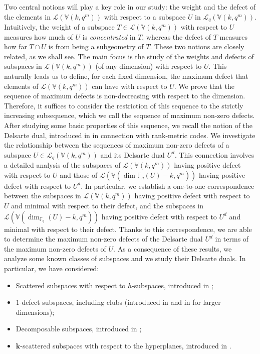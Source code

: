 \documentclass[11pt]{amsart}
\newcommand{\fq}{{\mathbb F}_{q}}
\begin{document}
Two central notions will play a key role in our study: the weight and the defect of the elements in ${\mathcal L}(\mathbb{V}(k, q^m))$ with respect to a subspace $U$ in ${\mathcal L}_q(\mathbb{V}(k, q^m))$.
Intuitively, the weight of a subspace $T \in {\mathcal L}(\mathbb{V}(k, q^m))$ with respect to $U$ measures how much of $U$ is \emph{concentrated} in $T$, whereas the defect of $T$ measures how far $T \cap U$ is from being a subgeometry of $T$. These two notions are closely related, as we shall see.
The main focus is the study of the weights and defects of subspaces in ${\mathcal L}(\mathbb{V}(k, q^m))$ (of any dimension) with respect to $U$. This naturally leads us to define, for each fixed dimension, the maximum defect that  elements of ${\mathcal L}(\mathbb{V}(k, q^m))$ can have with respect to $U$.
We prove that the sequence of maximum defects is non-decreasing with respect to the dimension. Therefore, it suffices to consider the restriction of this sequence to the strictly increasing subsequence, which we call the sequence of maximum non-zero defects.
After studying some basic properties of this sequence, we recall the notion of the Delsarte dual, introduced in \cite{csajbok2021generalising} in connection with rank-metric codes.
We investigate the relationship between the sequences of maximum non-zero defects of a subspace $U \in \mathcal{L}_q(\mathbb{V}(k,q^m))$ and its Delsarte dual $U^d$.
This connection involves a detailed analysis of the subspaces of $\mathcal{L}(\mathbb{V}(k,q^m))$ having positive defect with respect to $U$ and those of $\mathcal{L}(\mathbb{V}(\dim{\fq}(U)-k,q^m))$ having positive defect with respect to $U^d$.
In particular, we establish a one-to-one correspondence between the subspaces in $\mathcal{L}(\mathbb{V}(k,q^m))$ having positive defect with respect to $U$ and minimal with respect to their defect, and the subspaces in $\mathcal{L}(\mathbb{V}(\dim_{\fq}(U)-k,q^m))$ having positive defect with respect to $U^d$ and minimal with respect to their defect.
Thanks to this correspondence, we are able to determine the maximum non-zero defects of the Delsarte dual $U^d$ in terms of the maximum non-zero defects of $U$.
As a consequence of these results, we analyze some known classes of subspaces and we study their Delsarte duals. In particular, we have considered:
\begin{itemize}
    \item Scattered subspaces with respect to $h$-subspaces, introduced in \cite{lunardon2017mrd,sheekeyVdV,csajbok2021generalising,blokhuis2000scattered};
    \item $1$-defect subspaces, including clubs (introduced in \cite{fancsali2006maximal,fancsali2009description} and in \cite{mannaert2025clubs} for larger dimensions);
    \item Decomposable subspaces, introduced in \cite{bartoli2024Exceptional_sequences,santonastaso2024completely};
    \item $\mathbf{k}$-scattered subspaces with respect to the hyperplanes, introduced in \cite{alfarano2024representability}.
\end{itemize}
\end{document}

